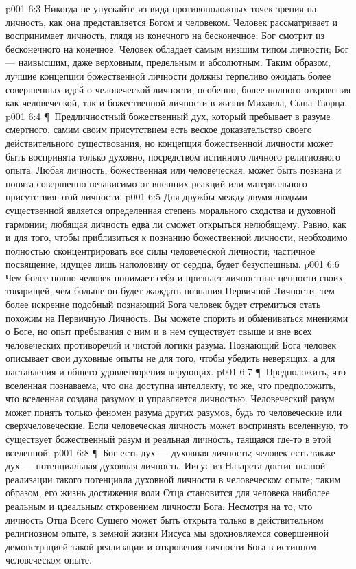 \vs p001 6:3 Никогда не упускайте из вида противоположных точек зрения на личность, как она представляется Богом и человеком. Человек рассматривает и воспринимает личность, глядя из конечного на бесконечное; Бог смотрит из бесконечного на конечное. Человек обладает самым низшим типом личности; Бог --- наивысшим, даже верховным, предельным и абсолютным. Таким образом, лучшие концепции божественной личности должны терпеливо ожидать более совершенных идей о человеческой личности, особенно, более полного откровения как человеческой, так и божественной личности в жизни Михаила, Сына\hyp{}Творца.
\vs p001 6:4 \P\ Предличностный божественный дух, который пребывает в разуме смертного, самим своим присутствием есть веское доказательство своего действительного существования, но концепция божественной личности может быть воспринята только духовно, посредством истинного личного религиозного опыта. Любая личность, божественная или человеческая, может быть познана и понята совершенно независимо от внешних реакций или материального присутствия этой личности.
\vs p001 6:5 Для дружбы между двумя людьми существенной является определенная степень морального сходства и духовной гармонии; любящая личность едва ли сможет открыться нелюбящему. Равно, как и для того, чтобы приблизиться к познанию божественной личности, необходимо полностью сконцентрировать все силы человеческой личности; частичное посвящение, идущее лишь наполовину от сердца, будет безуспешным.
\vs p001 6:6 Чем более полно человек понимает себя и признает личностные ценности своих товарищей, чем больше он будет жаждать познания Первичной Личности, тем более искренне подобный познающий Бога человек будет стремиться стать похожим на Первичную Личность. Вы можете спорить и обмениваться мнениями о Боге, но опыт пребывания с ним и в нем существует свыше и вне всех человеческих противоречий и чистой логики разума. Познающий Бога человек описывает свои духовные опыты не для того, чтобы убедить неверящих, а для наставления и общего удовлетворения верующих.
\vs p001 6:7 \P\ Предположить, что вселенная познаваема, что она доступна интеллекту, то же, что предположить, что вселенная создана разумом и управляется личностью. Человеческий разум может понять только феномен разума других разумов, будь то человеческие или сверхчеловеческие. Если человеческая личность может воспринять вселенную, то существует божественный разум и реальная личность, таящаяся где\hyp{}то в этой вселенной.
\vs p001 6:8 \P\ Бог есть дух --- духовная личность; человек есть также дух --- потенциальная духовная личность. Иисус из Назарета достиг полной реализации такого потенциала духовной личности в человеческом опыте; таким образом, его жизнь достижения воли Отца становится для человека наиболее реальным и идеальным откровением личности Бога. Несмотря на то, что личность Отца Всего Сущего может быть открыта только в действительном религиозном опыте, в земной жизни Иисуса мы вдохновляемся совершенной демонстрацией такой реализации и откровения личности Бога в истинном человеческом опыте.
